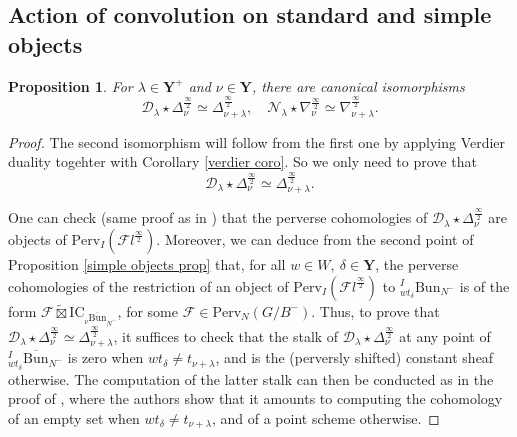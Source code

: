 \documentclass[11pt]{amsart}
\theoremstyle{plain}
\newtheorem{prop}[thm]{Proposition}
\theoremstyle{remark}
\numberwithin{equation}{section}
\begin{document}
	\subsection{Action of convolution on standard and simple objects}
	\begin{prop}{{\cite[Proposition 5.4.2]{ABBGM}}}\label{Prop Action of convolution on standard objects}
		For $\lambda\in\mathbf{Y}^+$ and $\nu\in\mathbf{Y}$, there are canonical isomorphisms
		\begin{equation*}
		    \mathcal{D}_\lambda\star\Delta^{\frac{\infty}{2}}_\nu\simeq\Delta^{\frac{\infty}{2}}_{\nu+\lambda},\quad \mathcal{N}_\lambda\star\nabla^{\frac{\infty}{2}}_\nu\simeq\nabla^{\frac{\infty}{2}}_{\nu+\lambda}.
		\end{equation*}
	\end{prop}
	\begin{proof}
  The second isomorphism will follow from the first one by applying Verdier duality togehter with Corollary \ref{verdier coro}. So we only need to prove that
 $$ \mathcal{D}_\lambda\star\Delta^{\frac{\infty}{2}}_\nu\simeq\Delta^{\frac{\infty}{2}}_{\nu+\lambda}.$$
 
		One can check (same proof as in \cite[Proposition 5.1.5]{ABBGM}) that the perverse cohomologies of $\mathcal{D}_\lambda\star\Delta^{\frac{\infty}{2}}_\nu$ are objects of $\mathrm{Perv}_{I}(\mathcal{F}l^{\frac{\infty}{2}})$. Moreover, we can deduce from the second point of Proposition \ref{simple objects prop} that, for all $w\in W,~\delta\in\mathbf{Y}$, the perverse cohomologies of the restriction of an object of $\mathrm{Perv}_{I}(\mathcal{F}l^{\frac{\infty}{2}})$ to $_{wt_\delta}^{I}\mathrm{Bun}_{N^-}$ is of the form $\mathcal{F}\widetilde{\boxtimes}\mathrm{IC}_{{_\nu\overline{\mathrm{Bun}}}_{N^-}}$, for some $\mathcal{F}\in \mathrm{Perv}_N(G/B^-)$. Thus, to prove that $\mathcal{D}_\lambda\star\Delta^{\frac{\infty}{2}}_\nu\simeq\Delta^{\frac{\infty}{2}}_{\nu+\lambda}$, it suffices to check that the stalk of $\mathcal{D}_\lambda\star\Delta^{\frac{\infty}{2}}_\nu$ at any point of $_{wt_\delta}^{I}\overline{\mathrm{Bun}}_{N^-}$ is zero when $wt_\delta\neq t_{\nu+\lambda}$, and is the (perversly shifted) constant sheaf otherwise. The computation of the latter stalk can then be conducted as in the proof of \cite[Proposition 5.4.2]{ABBGM}, where the authors show that it amounts to computing the cohomology of an empty set when $wt_\delta\neq t_{\nu+\lambda}$, and of a point scheme otherwise.
	\end{proof}
\end{document}
